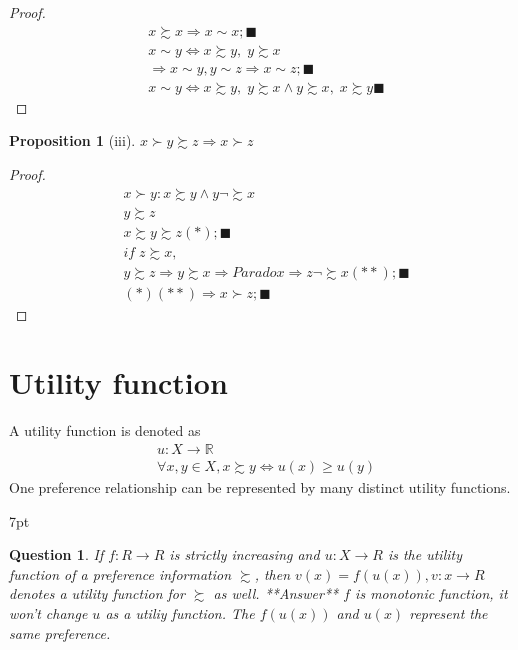 \documentclass{article}
\newenvironment{redblock}{
\def\FrameCommand{
  \hspace{1pt}
    {\color{LightCoral}
    \vrule width 2pt}
    {\color{redshade}
    \vrule width 4pt}
  \colorbox{redshade}
}
\MakeFramed{
  \advance
  \hsize-
  \width
  \FrameRestore}
\noindent\hspace{-4.55pt}%
\begin{adjustwidth}{}{7pt}
\vspace{2pt}\vspace{2pt}
}
{\vspace{2pt}\end{adjustwidth}\endMakeFramed}
\newtheorem{question}{Question}
\newtheorem{proposition}{Proposition}
\begin{document}
\begin{proof}
\begin{align}
& x\succsim x\Rightarrow x\sim x; \blacksquare
\\& x\sim y \iff x\succsim y,\;y \succsim x
\\&\Rightarrow x\sim y, y\sim z \Rightarrow x\sim z; \blacksquare
\\&x\sim y \iff x\succsim y,\;y \succsim x \land y\succsim x,\;x \succsim y \blacksquare
\end{align}
\end{proof}


\begin{proposition}[iii]
$x\succ y \succsim z \Rightarrow x \succ z$
\end{proposition}

\begin{proof}
\begin{align}
&x\succ y:x\succsim y \land y \neg \succsim x
\\&y\succsim z
\\&x\succsim y \succsim z(*); \blacksquare
\\& if\; z \succsim x,
\\&y \succsim z \Rightarrow y \succsim x \Rightarrow Paradox \Rightarrow z\neg \succsim x(**); \blacksquare
\\& (*)(**)\Rightarrow x \succ z ; \blacksquare
\end{align}
\end{proof}

\section{Utility function}
A utility function is denoted as
\begin{align}
&u:X\rightarrow \mathbb{R}
\\&\forall x,y \in X, x\succsim y \iff u(x)\geqslant u(y)
\end{align}
One preference relationship can be represented by many distinct utility functions.

\begin{redblock}
\begin{question}
If $f: R \rightarrow R$ is strictly increasing and $u: X \rightarrow R$ is the utility function of a preference information $\succsim$, then $v(x)=f(u(x)), v: x \rightarrow R$  denotes a utility function for $\succsim$ as well.
**Answer**
$f$ is monotonic function, it won't change $u$ as a utiliy function. The $f(u(x))$ and $u(x)$ represent the same preference.
\end{question}
\end{redblock}
\end{document}
